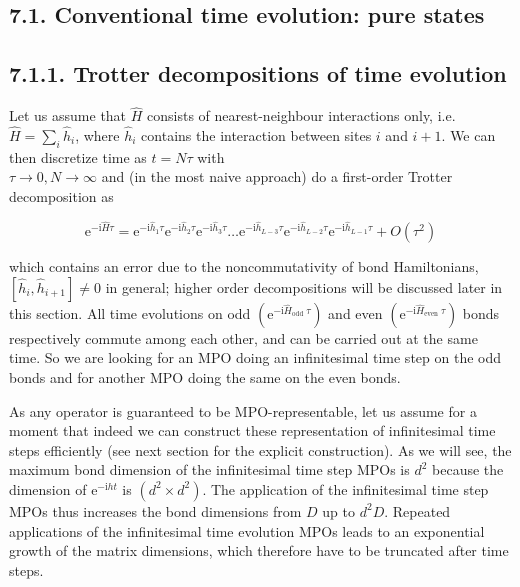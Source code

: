 \documentclass[12pt]{article}
\begin{document}
\subsection*{7.1. Conventional time evolution: pure states}
\subsection*{7.1.1. Trotter decompositions of time evolution}
Let us assume that $\hat{H}$ consists of nearest-neighbour interactions only, i.e. $\hat{H}=\sum_{i} \hat{h}_{i}$, where $\hat{h}_{i}$ contains the interaction between sites $i$ and $i+1$. We can then discretize time as $t=N \tau$ with\\
$\tau \rightarrow 0, N \rightarrow \infty$ and (in the most naive approach) do a first-order Trotter decomposition as


\begin{equation*}
\mathrm{e}^{-\mathrm{i} \hat{H} \tau}=\mathrm{e}^{-\mathrm{i} \hat{h}_{1} \tau} \mathrm{e}^{-\mathrm{i} \hat{h}_{2} \tau} \mathrm{e}^{-\mathrm{i} \hat{h}_{3} \tau} \ldots \mathrm{e}^{-\mathrm{i} \hat{h}_{L-3} \tau} \mathrm{e}^{-\mathrm{i} \hat{h}_{L-2} \tau} \mathrm{e}^{-\mathrm{i} \hat{h}_{L-1} \tau}+O\left(\tau^{2}\right) \tag{226}
\end{equation*}


which contains an error due to the noncommutativity of bond Hamiltonians, $\left[\hat{h}_{i}, \hat{h}_{i+1}\right] \neq 0$ in general; higher order decompositions will be discussed later in this section. All time evolutions on odd $\left(\mathrm{e}^{-\mathrm{i} \hat{H}_{\text {odd }} \tau}\right)$ and even $\left(\mathrm{e}^{-\mathrm{i} \hat{H}_{\text {even }} \tau}\right)$ bonds respectively commute among each other, and can be carried out at the same time. So we are looking for an MPO doing an infinitesimal time step on the odd bonds and for another MPO doing the same on the even bonds.

As any operator is guaranteed to be MPO-representable, let us assume for a moment that indeed we can construct these representation of infinitesimal time steps efficiently (see next section for the explicit construction). As we will see, the maximum bond dimension of the infinitesimal time step MPOs is $d^{2}$ because the dimension of $\mathrm{e}^{-\mathrm{i} h t}$ is $\left(d^{2} \times d^{2}\right)$. The application of the infinitesimal time step MPOs thus increases the bond dimensions from $D$ up to $d^{2} D$. Repeated applications of the infinitesimal time evolution MPOs leads to an exponential growth of the matrix dimensions, which therefore have to be truncated after time steps.
\end{document}
